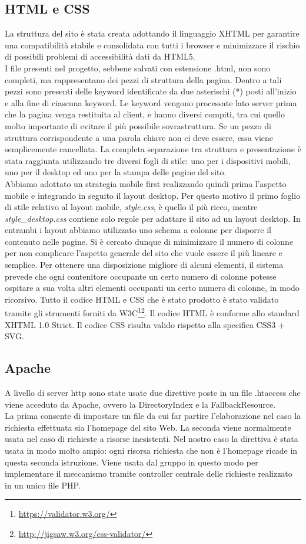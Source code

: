 \subsection{HTML e CSS}
La struttura del sito è stata creata adottando il linguaggio XHTML per garantire una compatibilità stabile e consolidata con tutti i browser e minimizzare il rischio di possibili problemi di accessibilità dati da HTML5.\\
I file presenti nel progetto, sebbene salvati con estensione .html, non sono completi, ma rappresentano dei pezzi di struttura della pagina. Dentro a tali pezzi sono presenti delle keyword identificate da due asterischi (*) posti all'inizio e alla fine di ciascuna keyword. Le keyword vengono processate lato server prima che la pagina venga restituita al client, e hanno diversi compiti, tra cui quello molto importante di evitare il più possibile sovrastruttura. Se un pezzo di struttura corrispondente a una parola chiave non ci deve essere, essa viene semplicemente cancellata.
La completa separazione tra struttura e presentazione è stata raggiunta utilizzando tre diversi fogli di stile: uno per i dispositivi mobili, uno per il desktop ed uno per la stampa delle pagine del sito.\\
 Abbiamo adottato un strategia mobile first realizzando quindi prima l'aspetto mobile e integrando in seguito il layout desktop. Per questo motivo il primo foglio di stile relativo al layout mobile, \textit{style.css}, è quello il più ricco, mentre \textit{style\_desktop.css} contiene solo regole per adattare il sito ad un layout desktop. In entrambi i layout abbiamo utilizzato uno schema a colonne per disporre il contenuto nelle pagine. Si è cercato dunque di minimizzare il numero di colonne per non complicare l'aspetto generale del sito che vuole essere il più lineare e semplice. Per ottenere una disposizione migliore di alcuni elementi, il sistema prevede che ogni contenitore occupante un certo numero di colonne potesse ospitare a sua volta altri elementi occupanti un certo numero di colonne, in modo ricorsivo.
Tutto il codice HTML e CSS che è stato prodotto è stato validato tramite gli strumenti forniti da W3C\footnote{\url{https://validator.w3.org/}}\footnote{\url{http://jigsaw.w3.org/css-validator/}}. Il codice HTML è conforme allo standard XHTML 1.0 Strict. Il codice CSS risulta valido rispetto alla specifica CSS3 + SVG.

\subsection{Apache}
A livello di server http sono state usate due direttive poste in un file .htaccess che viene acceduto da Apache, ovvero la DirectoryIndex e la FallbackResource.\\
La prima consente di impostare un file da cui far partire l'elaborazione nel caso la richiesta effettuata sia l'homepage del sito Web.
La seconda viene normalmente usata nel caso di richieste a risorse inesistenti.
Nel nostro caso la direttiva è stata usata in modo molto ampio: ogni risorsa richiesta che non è l'homepage ricade in questa seconda istruzione.
Viene usata dal gruppo in questo modo per implementare il meccanismo tramite controller centrale delle richieste realizzato in un unico file PHP.

